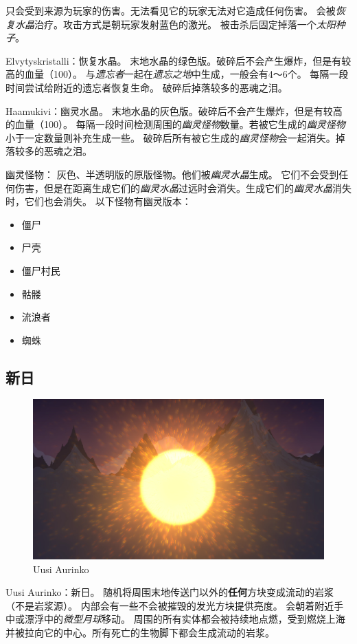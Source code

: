 \documentclass[11pt]{article}
\begin{document}
    只会受到来源为玩家的伤害。无法看见它的玩家无法对它造成任何伤害。
    会被\textit{恢复水晶}治疗。攻击方式是朝玩家发射蓝色的激光。
    被击杀后固定掉落一个\textit{太阳种子}。

    Elvytyskristalli：恢复水晶。
    末地水晶的绿色版。破碎后不会产生爆炸，但是有较高的血量（100）。
    与\textit{遗忘者}一起在\textit{遗忘之地}中生成，一般会有4～6个。
    每隔一段时间尝试给附近的遗忘者恢复生命。
    破碎后掉落较多的恶魂之泪。

    Haamukivi：幽灵水晶。
    末地水晶的灰色版。破碎后不会产生爆炸，但是有较高的血量（100）。
    每隔一段时间检测周围的\textit{幽灵怪物}数量。若被它生成的\textit{幽灵怪物}小于一定数量则补充生成一些。
    破碎后所有被它生成的\textit{幽灵怪物}会一起消失。掉落较多的恶魂之泪。

    幽灵怪物：
    灰色、半透明版的原版怪物。他们被\textit{幽灵水晶}生成。
    它们不会受到任何伤害，但是在距离生成它们的\textit{幽灵水晶}过远时会消失。生成它们的\textit{幽灵水晶}消失时，它们也会消失。
    以下怪物有幽灵版本：
    \begin{itemize}
        \item 僵尸
        \item 尸壳
        \item 僵尸村民
        \item 骷髅
        \item 流浪者
        \item 蜘蛛
    \end{itemize}

    \subsection{新日}\label{subsec:new-sun}
    \begin{figure}[ht]
        \includegraphics[width=\textwidth]{./imgs/New_Sun}
        \caption{Uusi Aurinko}\label{fig:new-sun}
    \end{figure}
    Uusi Aurinko：新日。
    随机将周围末地传送门以外的\textbf{任何}方块变成流动的岩浆（不是岩浆源）。
    内部会有一些不会被摧毁的发光方块提供亮度。
    会朝着附近手中或漂浮中的\textit{微型月球}移动。
    周围的所有实体都会被持续地点燃，受到燃烧上海并被拉向它的中心。所有死亡的生物脚下都会生成流动的岩浆。
\end{document}
